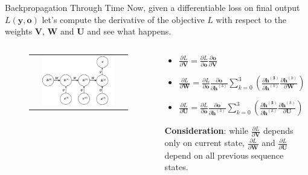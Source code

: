 \documentclass[aspectratio=169]{beamer}
\begin{document}
\begin{frame}{Backpropagation Through Time}
Now, given a differentiable loss on final output $L(\bm{y}, \bm{o})$ let's compute the derivative of the objective $L$ with respect to the weights $\bm{V}$, $\bm{W}$ and $\bm{U}$ and see what happens.
\vspace{0.5cm}
\begin{columns}
\begin{column}{0.5\textwidth}
\begin{figure}
	\begin{tabular}{c}
		\includegraphics[width=0.8\textwidth]{img/rnn/bptt_unroll.png}
	\end{tabular}
\end{figure}
\end{column}
\begin{column}{0.5\textwidth}
\begin{itemize}
\item $\frac{\partial L}{\partial \bm{V}} = \frac{\partial L}{\partial \bm{o}} \frac{\partial \bm{o}}{\partial \bm{V}}$
\item $\frac{\partial L}{\partial \bm{W}} = \frac{\partial L}{\partial \bm{o}} \frac{\partial \bm{o}}{\partial \bm{h}^{(3)}} \sum_{k=0}^{3}\left(\frac{\partial \bm{h^{(3)}}}{\partial \bm{h}^{(k)}}\frac{\partial \bm{h}^{(k)}}{{\partial \bm{W}}}\right)$
\item $\frac{\partial L}{\partial \bm{U}} = \frac{\partial L}{\partial \bm{o}} \frac{\partial \bm{o}}{\partial \bm{h}^{(3)}} \sum_{k=0}^{3}\left(\frac{\partial \bm{h^{(3)}}}{\partial \bm{h}^{(k)}}\frac{\partial \bm{h}^{(k)}}{{\partial \bm{U}}}\right)$
\end{itemize}
\vspace{0.5cm}
\textbf{Consideration}: while $\frac{\partial L}{\partial \bm{V}}$ depends only on current state, $\frac{\partial L}{\partial \bm{W}}$ and $\frac{\partial L}{\partial \bm{U}}$ depend on all previous sequence states.
\end{column}
\end{columns}
\end{frame}
\end{document}
